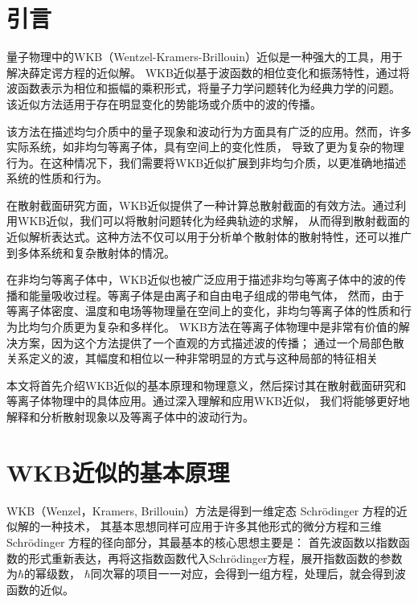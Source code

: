 \documentclass[12pt]{article}
\begin{document}
\pagestyle{headings}
\section{引言}
量子物理中的WKB（Wentzel-Kramers-Brillouin）近似是一种强大的工具，用于解决薛定谔方程的近似解。
WKB近似基于波函数的相位变化和振荡特性，通过将波函数表示为相位和振幅的乘积形式，将量子力学问题转化为经典力学的问题。
该近似方法适用于存在明显变化的势能场或介质中的波的传播。

该方法在描述均匀介质中的量子现象和波动行为方面具有广泛的应用。然而，许多实际系统，如非均匀等离子体，具有空间上的变化性质，
导致了更为复杂的物理行为。在这种情况下，我们需要将WKB近似扩展到非均匀介质，以更准确地描述系统的性质和行为。

在散射截面研究方面，WKB近似提供了一种计算总散射截面的有效方法。通过利用WKB近似，我们可以将散射问题转化为经典轨迹的求解，
从而得到散射截面的近似解析表达式。这种方法不仅可以用于分析单个散射体的散射特性，还可以推广到多体系统和复杂散射体的情况。

在非均匀等离子体中，WKB近似也被广泛应用于描述非均匀等离子体中的波的传播和能量吸收过程。等离子体是由离子和自由电子组成的带电气体，
然而，由于等离子体密度、温度和电场等物理量在空间上的变化，非均匀等离子体的性质和行为比均匀介质更为复杂和多样化。
WKB方法在等离子体物理中是非常有价值的解决方案，因为这个方法提供了一个直观的方式描述波的传播；
通过一个局部色散关系定义的波，其幅度和相位以一种非常明显的方式与这种局部的特征相关

本文将首先介绍WKB近似的基本原理和物理意义，然后探讨其在散射截面研究和等离子体物理中的具体应用。通过深入理解和应用WKB近似，
我们将能够更好地解释和分析散射现象以及等离子体中的波动行为。

\section{WKB近似的基本原理}
WKB（Wenzel，Kramers, Brillouin）方法是得到一维定态 Schrödinger 方程的近似解的一种技术，
其基本思想同样可应用于许多其他形式的微分方程和三维 Schrödinger 方程的径向部分，其最基本的核心思想主要是：
首先波函数以指数函数的形式重新表达，再将这指数函数代入Schrödinger方程，展开指数函数的参数为$\hbar$的幂级数，
$\hbar$同次幂的项目一一对应，会得到一组方程，处理后，就会得到波函数的近似。
\end{document}
